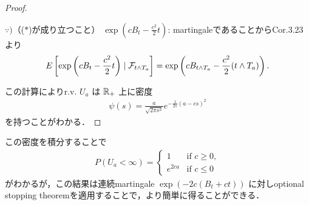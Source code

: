 \documentclass{jsarticle}
\begin{document}
\begin{proof}
    \begin{screen}
        $\because)$（($\ast$)が成り立つこと）
        $\exp\left(cB_t-\frac{c^2}{2}t\right)$: martingaleであることからCor.3.23より
        \begin{align}
            E\left[\exp\left(cB_t-\frac{c^2}{2}t\right)\mid\mathcal{F}_{t\wedge T_a}\right]
            = \exp\left(cB_{t\wedge T_a}-\frac{c^2}{2}(t\wedge T_a)\right).
        \end{align}
    \end{screen}
    
    この計算によりr.v. $U_a$ は $\mathbb{R}_+$ 上に密度
    \begin{align}
        \psi(s)
        = \frac{a}{\sqrt{2\pi s^3}}e^{-\frac{1}{2s}(a-cs)^2}
    \end{align}
    を持つことがわかる．
\end{proof}

この密度を積分することで
\begin{align}
    P(U_a<\infty)=
    \begin{cases}
        1 &\text{if } c\ge0, \\
        e^{2ca} &\text{if } c\le0
    \end{cases}
\end{align}
がわかるが，この結果は連続martingale $\exp{(-2c(B_t+ct))}$ に対しoptional stopping theoremを適用することで，より簡単に得ることができる\nazo．
\end{document}
